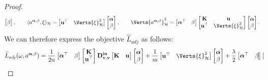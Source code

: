 \begin{proof}
\begin{align*}
\begin{bmatrix}
        \beta
    \end{bmatrix},\qquad \langle a^{\alphabf,\beta},\xi\rangle_{\mathcal{H}} = 
    \begin{bmatrix}
        \mathbf{u}^{\top} & 
        \Verts{\xi}^2_\mathcal{H}
    \end{bmatrix}
    \begin{bmatrix}
        \alphabf\\
        \beta
    \end{bmatrix},\qquad \Verts{a^{\alphabf,\beta}}^2_{\mathcal{H}} = 
    \begin{bmatrix}
        \alphabf^{\top} &
        \beta
    \end{bmatrix}\begin{bmatrix}
        \K & \mathbf{u}\\
        \mathbf{u}^{\top} & \Verts{\xi}^2_\mathcal{H}
    \end{bmatrix}\begin{bmatrix}
        \alphabf\\
        \beta
    \end{bmatrix}. 
\end{align*}
We can therefore express the objective $\widehat{L}_{adj}$ as follows:
\begin{align*}
	\widehat{L}_{adj}(\omega, a^{\alphabf,\beta})= \frac{1}{2n} \begin{bmatrix}
        \alphabf^{\top} &
        \beta
    \end{bmatrix}
    \begin{bmatrix}
        \K \\
        \mathbf{u}^{\top}
    \end{bmatrix}
    \Dtwo\begin{bmatrix}
        \K & 
        \mathbf{u}
    \end{bmatrix}
 \begin{bmatrix}
        \alphabf\\
        \beta
    \end{bmatrix} + \frac{1}{m}\begin{bmatrix}
        \mathbf{u}^{\top} & 
        \Verts{\xi}^2_\mathcal{H}
    \end{bmatrix}
    \begin{bmatrix}
        \alphabf\\
        \beta
    \end{bmatrix} + \frac{\lambda}{2}\begin{bmatrix}
        \alphabf^{\top} &
        \beta
    \end{bmatrix}\begin{bmatrix}

\end{bmatrix}
\end{align*}
\end{proof}

